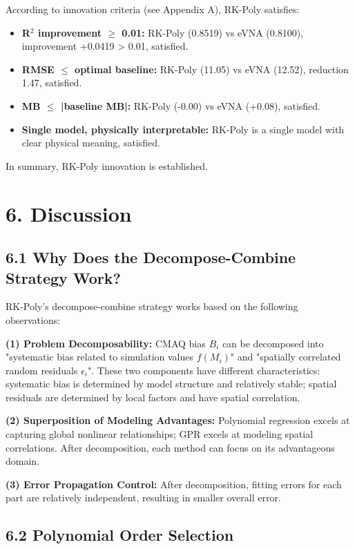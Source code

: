 \documentclass[a4paper]{article}
\begin{document}
According to innovation criteria (see Appendix A), RK-Poly satisfies:

\begin{itemize}
    \item \textbf{R$^2$ improvement $\ge$ 0.01:} RK-Poly (0.8519) vs eVNA (0.8100), improvement +0.0419 > 0.01, satisfied.
    \item \textbf{RMSE $\le$ optimal baseline:} RK-Poly (11.05) vs eVNA (12.52), reduction 1.47, satisfied.
    \item \textbf{MB $\le$ |baseline MB|:} RK-Poly (-0.00) vs eVNA (+0.08), satisfied.
    \item \textbf{Single model, physically interpretable:} RK-Poly is a single model with clear physical meaning, satisfied.
\end{itemize}

In summary, RK-Poly innovation is established.

\section{6. Discussion}

\subsection{6.1 Why Does the Decompose-Combine Strategy Work?}

RK-Poly's decompose-combine strategy works based on the following observations:

\textbf{(1) Problem Decomposability:} CMAQ bias $B_i$ can be decomposed into "systematic bias related to simulation values $f(M_i)$" and "spatially correlated random residuals $\epsilon_i$". These two components have different characteristics: systematic bias is determined by model structure and relatively stable; spatial residuals are determined by local factors and have spatial correlation.

\textbf{(2) Superposition of Modeling Advantages:} Polynomial regression excels at capturing global nonlinear relationships; GPR excels at modeling spatial correlations. After decomposition, each method can focus on its advantageous domain.

\textbf{(3) Error Propagation Control:} After decomposition, fitting errors for each part are relatively independent, resulting in smaller overall error.

\subsection{6.2 Polynomial Order Selection}
\end{document}

